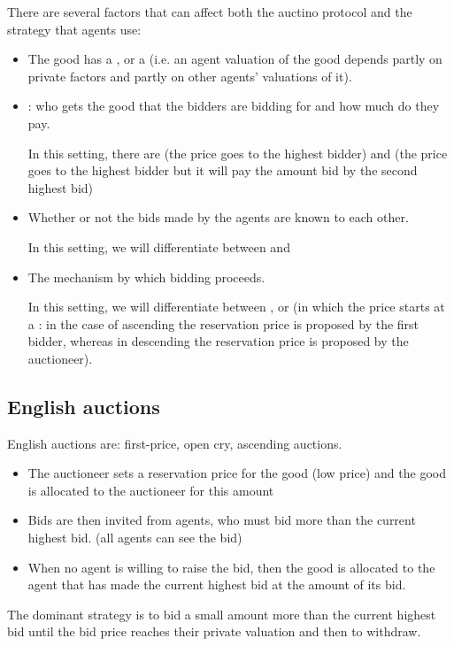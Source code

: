 There are several factors that can affect both the auctino protocol and the strategy that agents use:
\begin{itemize}
\item The good has a ,  or a  (i.e. an agent valuation of the good depends partly on private factors and partly on other agents' valuations of it).
\item {}: who gets the good that the bidders are bidding for and how much do they pay.

In this setting, there are  (the price goes to the highest bidder) and  (the price goes to the highest bidder but it will pay the amount bid by the second highest bid)
\item Whether or not the bids made by the agents are known to each other.

In this setting, we will  differentiate between  and 
\item The mechanism by which bidding proceeds.

In this setting, we will differentiate between ,  or  (in which the price starts at a : in the case of ascending the reservation price is proposed by the first bidder, whereas in descending the reservation price is proposed by the auctioneer).
\end{itemize}
\subsection{English auctions}
English auctions are: first-price, open cry, ascending auctions.

\begin{itemize}
\item The auctioneer sets a reservation price for the good (low price) and the good is allocated to the auctioneer for this amount
\item Bids are then invited from agents, who must bid more than the current highest bid. (all agents can see the bid)
\item When no agent is willing to raise the bid, then the good is allocated to the agent that has made the current highest bid at the amount of its bid.
\end{itemize}

The dominant strategy is to bid a small amount more than the current highest bid until the bid price reaches their private valuation and then to withdraw.

